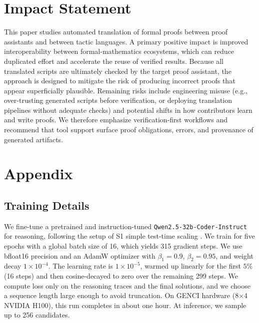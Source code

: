 \documentclass{article}
\theoremstyle{plain}
\theoremstyle{definition}
\theoremstyle{remark}
\begin{document}
	\section*{Impact Statement}
	This paper studies automated translation of formal proofs between proof assistants and between tactic languages. A primary positive impact is improved interoperability between formal-mathematics ecosystems, which can reduce duplicated effort and accelerate the reuse of verified results. Because all translated scripts are ultimately checked by the target proof assistant, the approach is designed to mitigate the risk of producing incorrect proofs that appear superficially plausible. Remaining risks include engineering misuse (e.g., over-trusting generated scripts before verification, or deploying translation pipelines without adequate checks) and potential shifts in how contributors learn and write proofs. We therefore emphasize verification-first workflows and recommend that tool support surface proof obligations, errors, and provenance of generated artifacts.
	
	
	

	\newpage
	\appendix
	\onecolumn
	
	
	\section{Appendix}
	
	
	\subsection{Training Details}
	\label{app:training}
	We fine-tune a pretrained and instruction-tuned \texttt{Qwen2.5-32b-Coder-Instruct}\cite{deepseek2024} for reasoning, following the setup of S1 simple test-time scaling \cite{s12025}. We train for five epochs with a global batch size of 16, which yields 315 gradient steps. We use bfloat16 precision and an AdamW optimizer with $\beta_1=0.9$, $\beta_2=0.95$, and weight decay $1\times 10^{-4}$. The learning rate is $1\times 10^{-5}$, warmed up linearly for the first $5\%$ (16 steps) and then cosine-decayed to zero over the remaining 299 steps. We compute loss only on the reasoning traces and the final solutions, and we choose a sequence length large enough to avoid truncation. On GENCI hardware (8$\times$4 NVIDIA H100), this run completes in about one hour.
	At inference, we sample up to 256 candidates.
	
	
\end{document}
